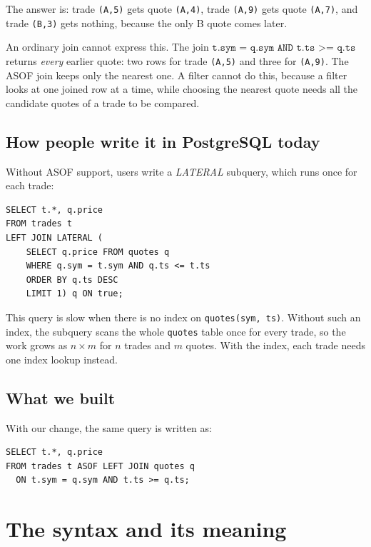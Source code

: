 \documentclass[11pt,a4paper]{article}
\newcommand{\code}[1]{\texttt{#1}}
\begin{document}
\noindent The answer is: trade \code{(A,5)} gets quote \code{(A,4)}, trade \code{(A,9)}
gets quote \code{(A,7)}, and trade \code{(B,3)} gets nothing, because the only B quote
comes later.

An ordinary join cannot express this. The join
$\texttt{t.sym = q.sym AND t.ts >= q.ts}$ returns \emph{every} earlier quote: two rows for
trade \code{(A,5)} and three for \code{(A,9)}. The ASOF join keeps only the nearest one.
A filter cannot do this, because a filter looks at one joined row at a time, while
choosing the nearest quote needs all the candidate quotes of a trade to be compared.

\subsection{How people write it in PostgreSQL today}
\label{sec:lateral}

Without ASOF support, users write a \emph{LATERAL} subquery, which runs once for each
trade:

\begin{lstlisting}
SELECT t.*, q.price
FROM trades t
LEFT JOIN LATERAL (
    SELECT q.price FROM quotes q
    WHERE q.sym = t.sym AND q.ts <= t.ts
    ORDER BY q.ts DESC
    LIMIT 1) q ON true;
\end{lstlisting}

This query is slow when there is no index on \code{quotes(sym, ts)}. Without such an
index, the subquery scans the whole \code{quotes} table once for every trade, so the work
grows as $n \times m$ for $n$ trades and $m$ quotes. With the index, each trade needs one
index lookup instead.

\subsection{What we built}

With our change, the same query is written as:

\begin{lstlisting}
SELECT t.*, q.price
FROM trades t ASOF LEFT JOIN quotes q
  ON t.sym = q.sym AND t.ts >= q.ts;
\end{lstlisting}

\section{The syntax and its meaning}
\end{document}
